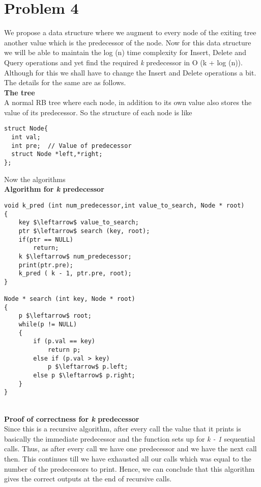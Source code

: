 \documentclass[a4paper,11pt]{article}
\theoremstyle{mytheor}
\begin{document}
\section*{Problem 4}
We propose a data structure where we augment to every node of the exiting tree another value which is the predecessor of the node. Now for this data structure we will be able to maintain the log (n) time complexity for Insert, Delete and Query operations and yet find the required \textit{k} predecessor in  O (k + log (n)). Although for this we shall have to change the Insert and Delete operations a bit. The details for the same are as follows.\\
\textbf{The tree}\\
A normal RB tree where each node, in addition to its own value also stores the value of its predecessor. So the structure of each node is like\\
\begin{lstlisting}[label={list:first},caption=Node Structure.]
struct Node{
  int val;
  int pre;	// Value of predecessor
  struct Node *left,*right;  
};
\end{lstlisting}
\pagebreak
Now the algorithms\\
\textbf{Algorithm for \textit{k} predecessor}\\
\begin{lstlisting}[label={list:first},caption=k predecessor, mathescape = true]
void k_pred (int num_predecessor,int value_to_search, Node * root)
{
	key $\leftarrow$ value_to_search;
	ptr $\leftarrow$ search (key, root);
	if(ptr == NULL)
		return;
	k $\leftarrow$ num_predecessor;
	print(ptr.pre);
	k_pred ( k - 1, ptr.pre, root);
}

Node * search (int key, Node * root)
{
	p $\leftarrow$ root;
	while(p != NULL)
	{
		if (p.val == key)
			return p;
		else if (p.val > key)
			p $\leftarrow$ p.left;
		else p $\leftarrow$ p.right;
	}
}
\end{lstlisting}
\\
\textbf{Proof of correctness for \textit{k} predecessor}\\
Since this is a recursive algorithm,  after every call the value that it prints is basically the immediate predecessor and the function sets up for \textit{k - 1} sequential calls. Thus, as after every call we have one predecessor and we have the next call then. This continues till we have exhausted all our calls which was equal to the number of the predecessors to print.
Hence, we can conclude that this algorithm gives the correct outputs at the end of recursive calls.\\
\end{document}
